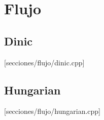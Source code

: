 \newpage
\section{Flujo}

\subsection{Dinic}
[secciones/flujo/dinic.cpp]

\subsection{Hungarian}
[secciones/flujo/hungarian.cpp]